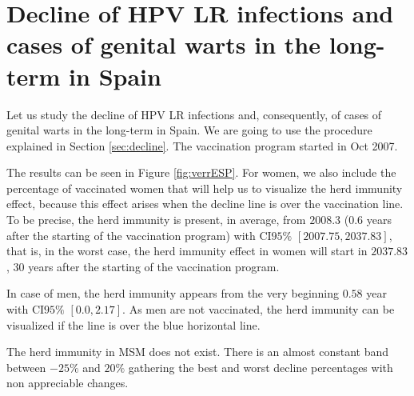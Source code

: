 \section{Decline of HPV LR infections and cases of genital warts in the long-term in Spain}
Let us study the decline of HPV LR infections and, consequently, of cases of genital warts in the long-term in Spain. We are going to use the procedure explained in Section \ref{sec:decline}. The vaccination program started in Oct 2007.

The results can be seen in Figure \ref{fig:verrESP}. For women, we also include the percentage of vaccinated women that will help us to visualize the herd immunity effect, because this effect arises when the decline line is over the vaccination line. To be precise, the herd immunity is present, in average, from $2008.3$ ($0.6$ years after the starting of the vaccination program) with CI$95\%$ $[2007.75, 2037.83]$, that is, in the worst case, the herd immunity effect in women will start in $2037.83$, $30$ years after the starting of the vaccination program. 

In case of men, the herd immunity appears from the very beginning $0.58$ year with CI$95\%$ $[0.0, 2.17]$. As men are not vaccinated, the herd immunity can be visualized if the line is over the blue horizontal line. 

The herd immunity in MSM does not exist. There is an almost constant band between $-25\%$ and $20\%$ gathering the best and worst decline percentages with non appreciable changes.

